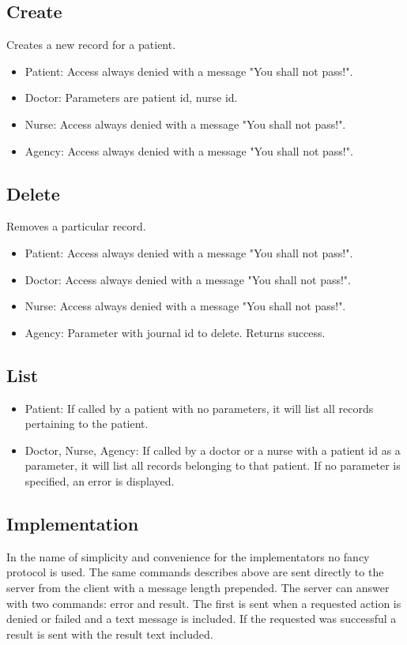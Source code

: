 \documentclass[10pt, a4paper]{article}
\begin{document}
\subsection{Create}
Creates a new record for a patient.
\begin{itemize}
\item Patient: Access always denied with a message "You shall not pass!".
\item Doctor: Parameters are patient id, nurse id.
\item Nurse: Access always denied with a message "You shall not pass!".
\item Agency: Access always denied with a message "You shall not pass!".
\end{itemize}

\subsection{Delete}
Removes a particular record.
\begin{itemize}
\item Patient: Access always denied with a message "You shall not pass!".
\item Doctor: Access always denied with a message "You shall not pass!".
\item Nurse: Access always denied with a message "You shall not pass!".
\item Agency: Parameter with journal id to delete. Returns success.
\end{itemize}

\subsection{List}
\begin{itemize}
\item Patient: If called by a patient with no parameters, it will list all records pertaining to the patient.
\item Doctor, Nurse, Agency: If called by a doctor or a nurse with a patient id as a parameter, it will list all records belonging to that patient. If no parameter is specified, an error is displayed.
\end{itemize}

\subsection{Implementation}
In the name of simplicity and convenience for the implementators no fancy protocol is used. The same commands describes above are sent directly to the server from the client with a message length prepended. The server can answer with two commands: error and result. The first is sent when a requested action is denied or failed and a text message is included. If the requested was successful a result is sent with the result text included.
\end{document}
